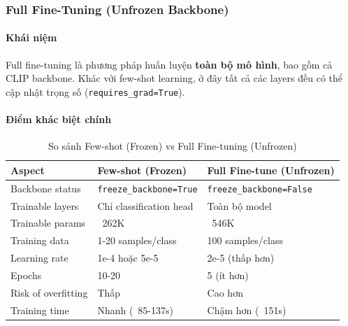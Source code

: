 \subsubsection{Full Fine-Tuning (Unfrozen Backbone)}\label{subsubsec:full-finetune}

\paragraph{Khái niệm}
Full fine-tuning là phương pháp huấn luyện \textbf{toàn bộ mô hình}, bao gồm cả CLIP backbone. Khác với few-shot learning, ở đây tất cả các layers đều có thể cập nhật trọng số (\texttt{requires\_grad=True}).

\paragraph{Điểm khác biệt chính}
\begin{table}[H]
    \centering
    \caption{So sánh Few-shot (Frozen) vs Full Fine-tuning (Unfrozen)}
    \begin{tabular}{|l|l|l|}
        \hline
        \textbf{Aspect} & \textbf{Few-shot (Frozen)} & \textbf{Full Fine-tune (Unfrozen)} \\
        \hline
        Backbone status & \texttt{freeze\_backbone=True} & \texttt{freeze\_backbone=False} \\
        \hline
        Trainable layers & Chỉ classification head & Toàn bộ model \\
        \hline
        Trainable params & ~262K & ~546K \\
        \hline
        Training data & 1-20 samples/class & 100 samples/class \\
        \hline
        Learning rate & 1e-4 hoặc 5e-5 & 2e-5 (thấp hơn) \\
        \hline
        Epochs & 10-20 & 5 (ít hơn) \\
        \hline
        Risk of overfitting & Thấp & Cao hơn \\
        \hline
        Training time & Nhanh (~85-137s) & Chậm hơn (~151s) \\
        \hline
    \end{tabular}
    \label{tab:frozen-vs-unfrozen}
\end{table}


